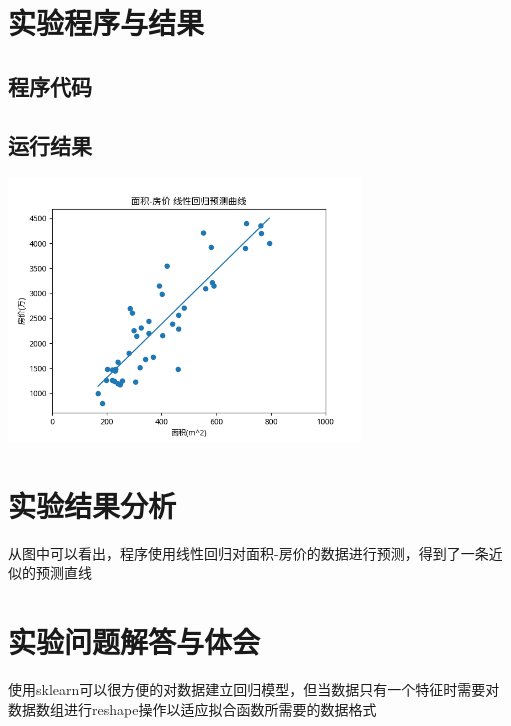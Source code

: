 \documentclass[a4paper]{ctexart}
\begin{document}
  \section{实验程序与结果}
  \subsection{程序代码}
  
  \subsection{运行结果}
  \includegraphics[width=0.7\textwidth]{fig/LR.png}


  \section{实验结果分析}
  从图中可以看出，程序使用线性回归对面积-房价的数据进行预测，得到了一条近似的预测直线

  \section{实验问题解答与体会}
  使用sklearn可以很方便的对数据建立回归模型，但当数据只有一个特征时需要对数据数组进行reshape操作以适应拟合函数所需要的数据格式
\end{document}
